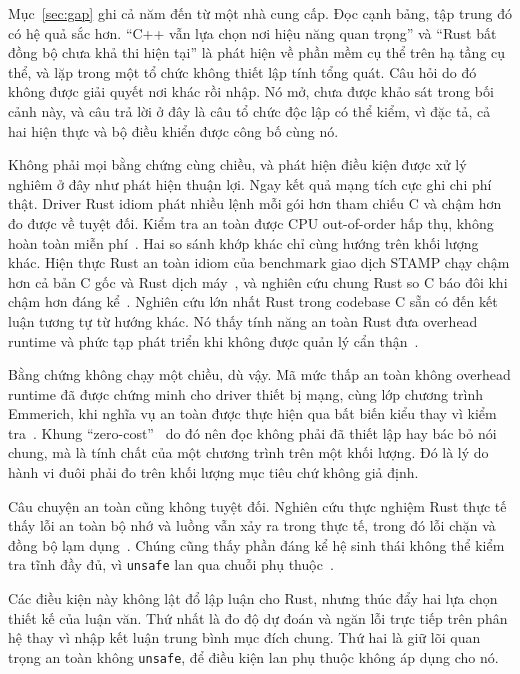 Mục~\ref{sec:gap} ghi cả năm đến từ một nhà cung cấp. Đọc cạnh bảng, tập trung
đó có hệ quả sắc hơn. ``C++ vẫn lựa chọn nơi hiệu năng quan trọng''
và ``Rust bất đồng bộ chưa khả thi hiện tại'' là phát hiện về phần mềm cụ thể trên
hạ tầng cụ thể, và lặp trong một tổ chức không thiết lập tính tổng quát. Câu hỏi do đó không được giải quyết nơi khác rồi nhập. Nó mở, chưa được khảo sát
trong bối cảnh này, và câu trả lời ở đây là câu tổ chức độc lập có thể kiểm, vì
đặc tả, cả hai hiện thực và bộ điều khiển được công bố cùng nó.

Không phải mọi bằng chứng cùng chiều, và phát hiện điều kiện được xử lý nghiêm
ở đây như phát hiện thuận lợi. Ngay kết quả mạng tích cực ghi chi phí thật. Driver Rust idiom phát
nhiều lệnh mỗi gói hơn tham chiếu C và chậm hơn đo được về
tuyệt đối. Kiểm tra an toàn được CPU out-of-order hấp thụ, không
hoàn toàn miễn phí~\cite{emmerich2019drivers}. Hai so sánh khớp khác chỉ cùng hướng trên
khối lượng khác. Hiện thực Rust an toàn idiom của benchmark giao dịch STAMP chạy
chậm hơn cả bản C gốc và Rust dịch máy~\cite{suchert2023stamp}, và
nghiên cứu chung Rust so C báo đôi khi chậm hơn đáng
kể~\cite{okawa2024ruststudy}. Nghiên cứu lớn nhất Rust trong codebase C sẵn có đến
kết luận tương tự từ hướng khác. Nó thấy tính năng an toàn Rust đưa
overhead runtime và phức tạp phát triển khi không được quản lý
cẩn thận~\cite{li2026rustlinux}.

Bằng chứng không chạy một chiều, dù vậy. Mã mức thấp an toàn không overhead runtime đã
được chứng minh cho driver thiết bị mạng, cùng lớp chương trình Emmerich, khi
nghĩa vụ an toàn được thực hiện qua bất biến kiểu thay vì kiểm tra~\cite{pirelli2023safelowlevel}.
Khung ``zero-cost''~\cite{balasubramanian2017rust} do đó nên đọc không phải
đã thiết lập hay bác bỏ nói chung, mà là tính chất của một chương trình trên một
khối lượng. Đó là lý do hành vi đuôi phải đo trên khối lượng mục tiêu chứ không giả định.

Câu chuyện an toàn cũng không tuyệt đối. Nghiên cứu thực nghiệm Rust thực tế thấy lỗi
an toàn bộ nhớ và luồng vẫn xảy ra trong thực tế, trong đó lỗi chặn và đồng bộ
lạm dụng~\cite{qin2020rust,qin2024safety}. Chúng cũng thấy phần đáng kể
hệ sinh thái không thể kiểm tra tĩnh đầy đủ, vì \texttt{unsafe} lan qua
chuỗi phụ thuộc~\cite{evans2020rust}.

Các điều kiện này không lật đổ lập luận cho Rust, nhưng thúc đẩy hai lựa chọn thiết kế của luận văn. Thứ nhất là đo độ dự đoán và ngăn lỗi trực tiếp trên
phân hệ thay vì nhập kết luận trung bình mục đích chung. Thứ hai là giữ
lõi quan trọng an toàn không \texttt{unsafe}, để điều kiện lan phụ thuộc không
áp dụng cho nó.

